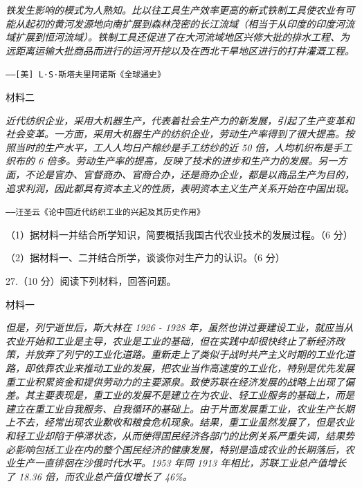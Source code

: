 \documentclass{ctexart}
\begin{document}
\textit{铁发生影响的模式为人熟知。比以往工具生产效率更高的新式铁制工具使农业有可能从起初的黄河发源地向南扩展到森林茂密的长江流域（相当于从印度的印度河流域扩展到恒河流域）。铁制工具还促进了在大河流域地区兴修大批的排水工程、为远距离运输大批商品而进行的运河开挖以及在西北干旱地区进行的打井灌溉工程。}

\begin{flushright}

\texttt{——[美] L·S·斯塔夫里阿诺斯《全球通史》}

\end{flushright}

\textsf{材料二}

\textit{近代纺织企业，采用大机器生产，代表着社会生产力的新发展，引起了生产变革和社会变革。一方面，采用大机器生产的纺织企业，劳动生产率得到了很大提高。按照当时的生产水平，工人人均日产棉纱是手工纺纱的近 50 倍，人均机织布是手工织布的 6 倍多。劳动生产率的提高，反映了技术的进步和生产力的发展。另一方面，不论是官办、官督商办、官商合办，还是商办企业，都是以商品生产为目的，追求利润，因此都具有资本主义的性质，表明资本主义生产关系开始在中国出现。}

\begin{flushright}

\texttt{——汪圣云《论中国近代纺织工业的兴起及其历史作用》}

\end{flushright}

（1）据材料一并结合所学知识，简要概括我国古代农业技术的发展过程。（6 分）

（2）据材料一、二并结合所学，谈谈你对生产力的认识。（6 分）

\bigskip

27.（10 分）阅读下列材料，回答问题。

\textsf{材料一}

\textit{但是，列宁逝世后，斯大林在 1926 - 1928 年，虽然也讲过要建设工业，就应当从农业开始和工业是主导，农业是工业的基础，但在实践中却很快终止了新经济政策，并放弃了列宁的工业化道路。重新走上了类似于战时共产主义时期的工业化道路，即依靠农业来推动工业的发展，把农业当作高速度的工业化，特别是优先发展重工业积累资金和提供劳动力的主要源泉。致使苏联在经济发展的战略上出现了偏差。其主要表现是，重工业的发展不是建立在为农业、轻工业服务的基础上，而是建立在重工业自我服务、自我循环的基础上。由于片面发展重工业，农业生产长期上不去，经常出现农业歉收和粮食危机现象。结果，重工业虽然发展了，但是农业和轻工业却陷于停滞状态，从而使得国民经济各部门的比例关系严重失调，结果势必影响包括工业在内的整个国民经济的健康发展，特别是造成农业的长期落后，农业生产一直徘徊在沙俄时代水平。1953 年同 1913 年相比，苏联工业总产值增长了 18.36 倍，而农业总产值仅增长了 46\%。}
\end{document}
